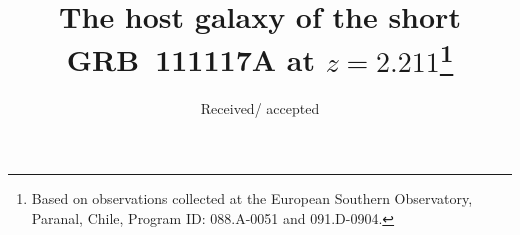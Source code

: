 \documentclass{aa}    %
\begin{document}
	
\title{The host galaxy of the short GRB~111117A at $z = 2.211$\thanks{Based on observations collected at the European Southern Observatory, Paranal, Chile, Program ID: 088.A-0051 and 091.D-0904.}}





\date{Received/ accepted}



\end{document}
